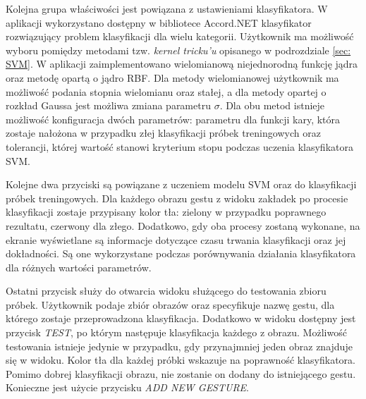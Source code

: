 Kolejna grupa właściwości jest powiązana z ustawieniami klasyfikatora. W aplikacji wykorzystano dostępny w bibliotece Accord.NET klasyfikator rozwiązujący problem klasyfikacji dla wielu kategorii. Użytkownik ma możliwość wyboru pomiędzy metodami tzw. \textit{kernel tricku'u} opisanego w podrozdziale \ref{sec: SVM}. W aplikacji zaimplementowano wielomianową niejednorodną funkcję jądra oraz metodę opartą o jądro RBF. Dla metody wielomianowej użytkownik ma możliwość podania stopnia wielomianu oraz stałej, a dla metody opartej o rozkład Gaussa jest możliwa zmiana parametru $\sigma$. Dla obu metod istnieje możliwość konfiguracja dwóch parametrów: parametru dla funkcji kary, która zostaje nałożona w przypadku złej klasyfikacji próbek treningowych oraz tolerancji, której wartość stanowi kryterium stopu podczas uczenia klasyfikatora SVM. 

Kolejne dwa przyciski są powiązane z uczeniem modelu SVM oraz do klasyfikacji próbek treningowych.  Dla każdego obrazu gestu z widoku zakładek po procesie klasyfikacji zostaje przypisany kolor tła: zielony w przypadku poprawnego rezultatu, czerwony dla złego. Dodatkowo, gdy oba procesy zostaną wykonane, na ekranie wyświetlane są informacje dotyczące czasu trwania klasyfikacji oraz jej dokładności. Są one wykorzystane podczas porównywania działania klasyfikatora dla różnych wartości parametrów.

Ostatni przycisk służy do otwarcia widoku służącego do testowania zbioru próbek. Użytkownik podaje zbiór obrazów oraz specyfikuje nazwę gestu, dla którego zostaje przeprowadzona klasyfikacja. Dodatkowo w widoku dostępny jest przycisk \textit{TEST}, po którym następuje klasyfikacja każdego z obrazu. Możliwość testowania istnieje jedynie w przypadku, gdy przynajmniej jeden obraz znajduje się w widoku. Kolor tła dla każdej próbki wskazuje na poprawność klasyfikatora. Pomimo dobrej klasyfikacji obrazu, nie zostanie on dodany do istniejącego gestu. Konieczne jest użycie przycisku \textit{ADD NEW GESTURE}.



























